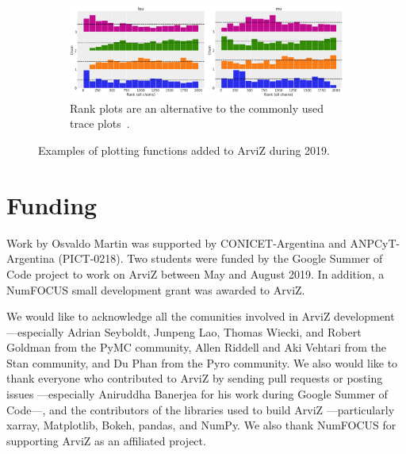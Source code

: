 \documentclass[anonymous=false, %
               format=acmsmall, %
               review=true, %
               screen=true, %
               nonacm=true]{acmart}
\begin{document}
\begin{figure}[!htb]
\begin{subfigure}{0.98\textwidth}
  \centering
    \includegraphics[width=\linewidth]{plot_rank.png}
    \caption{Rank plots are an alternative to the commonly used trace
      plots~\cite{vehtari2019rank}.}\label{fig:n2}
  \end{subfigure}
  \caption{Examples of plotting functions added to ArviZ during
  2019.}\label{fig:examples}
\end{figure}

\section*{Funding}
Work by Osvaldo Martin was supported by CONICET-Argentina and ANPCyT-Argentina
(PICT-0218). Two students were funded by the Google Summer of Code project to
work on ArviZ between May and August 2019. In addition, a NumFOCUS small
development grant was awarded to ArviZ.

\begin{acks}
  We would like to acknowledge all the comunities involved in ArviZ
  development ---especially Adrian Seyboldt, Junpeng Lao,
  Thomas Wiecki, and Robert Goldman from the PyMC community, Allen Riddell and
  Aki Vehtari from the Stan community, and Du Phan from the Pyro community.
  We also would like to thank everyone who contributed to ArviZ by sending pull
  requests or posting issues ---especially Aniruddha Banerjea for his work
  during Google Summer of Code---, and the contributors of the libraries used to
  build ArviZ ---particularly xarray, Matplotlib, Bokeh, pandas, and NumPy. We
  also thank NumFOCUS for supporting ArviZ as an affiliated project.
\end{acks}




\end{document}
